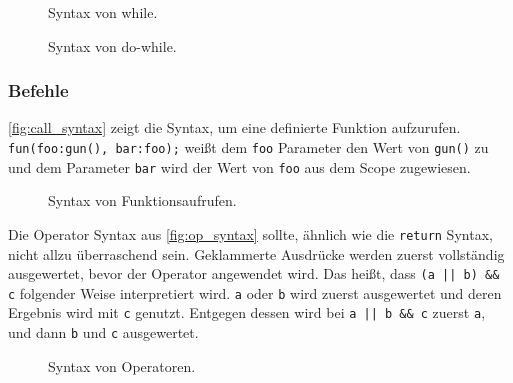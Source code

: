       \begin{figure}[H]
        \centering
        \caption{Syntax von while.}
        \label{fig:while_syntax}
      \end{figure}

      \begin{figure}[H]
        \centering
        \caption{Syntax von do-while.}
        \label{fig:do_while_syntax}
      \end{figure}



    \subsubsection{Befehle}
    \label{sssec:Befehle}
      \autoref{fig:call_syntax} zeigt die Syntax, um eine definierte Funktion aufzurufen. \lstinline[style=MyMacroStyle]$fun(foo:gun(), bar:foo);$ weißt dem \lstinline[style=MyMacroStyle]$foo$ Parameter den Wert von \lstinline[style=MyMacroStyle]$gun()$ zu und dem Parameter \lstinline[style=MyMacroStyle]$bar$ wird der Wert von \lstinline[style=MyMacroStyle]$foo$ aus dem Scope zugewiesen.
      \begin{figure}[H]
        \centering
        \caption{Syntax von Funktionsaufrufen.}
        \label{fig:call_syntax}
      \end{figure}

      Die Operator Syntax aus \autoref{fig:op_syntax} sollte, ähnlich wie die \lstinline[style=MyMacroStyle]$return$ Syntax, nicht allzu überraschend sein. Geklammerte Ausdrücke werden zuerst vollständig ausgewertet, bevor der Operator angewendet wird. Das heißt, dass \lstinline[style=MyMacroStyle]$(a || b) && c$ folgender Weise interpretiert wird. \lstinline[style=MyMacroStyle]$a$ oder \lstinline[style=MyMacroStyle]$b$ wird zuerst ausgewertet und deren Ergebnis wird mit \lstinline[style=MyMacroStyle]$c$ genutzt. Entgegen dessen wird bei \lstinline[style=MyMacroStyle]$a || b && c$ zuerst \lstinline[style=MyMacroStyle]$a$, und dann \lstinline[style=MyMacroStyle]$b$ und \lstinline[style=MyMacroStyle]$c$ ausgewertet.
      \begin{figure}[H]
        \centering
        \caption{Syntax von Operatoren.}
        \label{fig:op_syntax}
      \end{figure}
